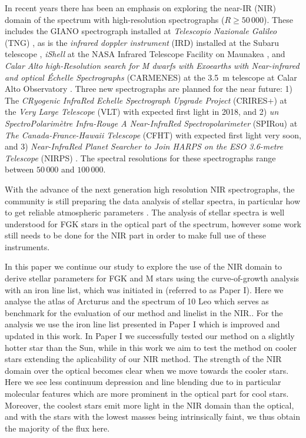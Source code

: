 \documentclass{aa}
\begin{document}
{In recent years there has been an emphasis on exploring the near-IR (NIR) domain of the spectrum
with high-resolution spectrographs ($R\ge50\,000$). These includes the GIANO spectrograph installed
at \emph{Telescopio Nazionale Galileo} (TNG) \citep{GIANO}, as is the \emph{infrared doppler
instrument} (IRD) installed at the Subaru telescope \citep{IRD}, \emph{iShell} at the NASA Infrared
Telescope Facility on Maunakea \citep{Rayner2016}, and \emph{Calar Alto high-Resolution search for M
dwarfs with Exoearths with Near-infrared and optical Échelle Spectrographs} (CARMENES) at the
\SI{3.5}{m} telescope at Calar Alto Observatory \citep{CARMENES}. Three new spectrographs are
planned for the near future: 1) The \emph{CRyogenic InfraRed Echelle Spectrograph Upgrade Project}
(CRIRES+) at the \emph{Very Large Telescope} (VLT) \citep{CRIRESp} with expected first light in
2018, and 2) \emph{un SpectroPolarimètre Infra-Rouge A Near-InfraRed Spectropolarimeter} (SPIRou) at
\emph{The Canada-France-Hawaii Telescope} (CFHT) \citep{SPIROU1,SPIROU2} with expected first light
very soon, and 3) \emph{Near-InfraRed Planet Searcher to Join HARPS on the ESO 3.6-metre Telescope}
(NIRPS) \citep{Bouchy2017}. The spectral resolutions for these spectrographs range between $50\,000$
and $100\,000$.

With the advance of the next generation high resolution NIR spectrographs, the community is still
preparing the data analysis of stellar spectra, in particular how to get reliable atmospheric
parameters \citep[see e.g.][]{Onehag2012,Lindgren2016,Andreasen2016,Passegger2016}. The analysis of
stellar spectra is well understood for FGK stars in the optical part of the spectrum, however some
work still needs to be done for the NIR part in order to make full use of these instruments.

In this paper we continue our study to explore the use of the NIR domain to derive stellar
parameters for FGK and M stars using the curve-of-growth analysis with an iron line list, which was
initiated in \citet{Andreasen2016} (referred to as Paper I). Here we analyse the atlas of Arcturus
and the spectrum of 10 Leo which serves as benchmark for the evaluation of our method and linelist
in the NIR.. For the analysis we use the iron line list presented in Paper I which is improved and
updated in this work. In Paper I we successfully tested our method on a slightly hotter star than
the Sun, while in this work we aim to test the method on cooler stars extending the aplicability of
our NIR method. The strength of the NIR domain over the optical becomes clear when we move towards
the cooler stars. Here we see less continuum depression and line blending due to in particular
molecular features which are more prominent in the optical part for cool stars. Moreover, the
coolest stars emit more light in the NIR domain than the optical, and with the stars with the lowest
masses being intrinsically faint, we thus obtain the majority of the flux here.

}
\end{document}
